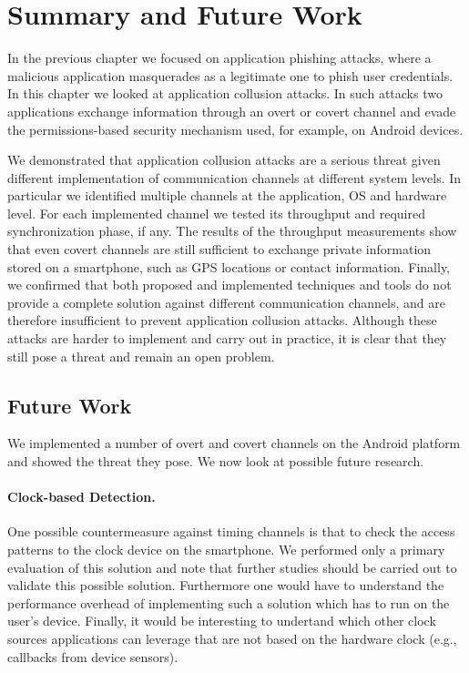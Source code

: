 \section{Summary and Future Work}

In the previous chapter we focused on application phishing attacks, where a malicious application masquerades as a legitimate one to phish user credentials. In this chapter we looked at application collusion attacks. In such attacks two applications exchange information through an overt or covert channel and evade the permissions-based security mechanism used, for example, on Android devices.

We demonstrated that application collusion attacks are a serious threat given different implementation of communication channels at different system levels. In particular we identified multiple channels at the application, OS and hardware level. For each implemented channel we tested its throughput and required synchronization phase, if any. The results of the throughput measurements show that even covert channels are still sufficient to exchange private information stored on a smartphone, such as GPS locations or contact information. Finally, we confirmed that both proposed and implemented techniques and tools do not provide a complete solution against different communication channels, and are therefore insufficient to prevent application collusion attacks. Although these attacks are harder to implement and carry out in practice, it is clear that they still pose a threat and remain an open problem.

\subsection{Future Work}

We implemented a number of overt and covert channels on the Android platform and showed the threat they pose. We now look at possible future research.

\paragraph{Clock-based Detection.} One possible countermeasure against timing channels is that to check the access patterns to the clock device on the smartphone. We performed only a primary evaluation of this solution and note that further studies should be carried out to validate this possible solution. Furthermore one would have to understand the performance overhead of implementing such a solution which has to run on the user's device. Finally, it would be interesting to undertand which other clock sources applications can leverage that are not based on the hardware clock (e.g., callbacks from device sensors).

